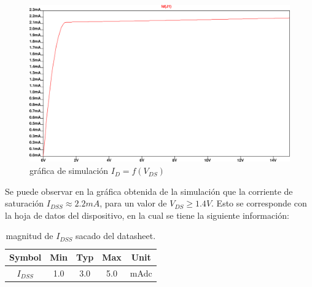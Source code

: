 \documentclass[chaptersright]{informeutn}
\begin{document}
    \begin{figure}[ht!]
        \centering
        \includegraphics[width=0.8\linewidth]{pictures/graf-saturacion.png}
        \caption{gráfica de simulación $I_D=f(V_{DS})$}
        \label{fig:graf-saturacion}
    \end{figure}

Se puede observar en la gráfica obtenida de la simulación que la corriente de saturación
$I_{DSS} \approx 2.2mA$, para un valor de $V_{DS} \ge 1.4V$. Esto se corresponde con la hoja
de datos del dispositivo, en la cual se tiene la siguiente información:

\begin{table}[H]
    \centering
    \begin{tabular}{|c| c c c |c|}
        \hline
        Symbol & Min & Typ & Max & Unit\\
        \hline
        $I_{DSS}$ & 1.0 & 3.0  & 5.0 & mAdc    \\
        \hline
    \end{tabular}
    \caption{magnitud de $I_{DSS}$ sacado del datasheet.}
\end{table}
    
\end{document}
